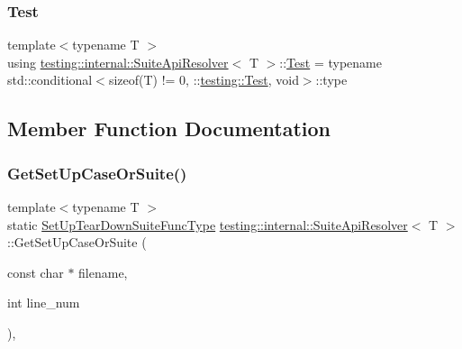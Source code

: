 \mbox{\label{structtesting_1_1internal_1_1_suite_api_resolver_a343c36f492a946d302b1cfc930266768}} 
\subsubsection{\texorpdfstring{Test}{Test}\hspace{0.1cm}{\footnotesize\ttfamily [2/2]}}
{\footnotesize\ttfamily template$<$typename T $>$ \\
using \mbox{\hyperlink{structtesting_1_1internal_1_1_suite_api_resolver}{testing\+::internal\+::\+Suite\+Api\+Resolver}}$<$ T $>$\+::\mbox{\hyperlink{structtesting_1_1internal_1_1_suite_api_resolver_a343c36f492a946d302b1cfc930266768}{Test}} =  typename std\+::conditional$<$sizeof(T) != 0, \+::\mbox{\hyperlink{classtesting_1_1_test}{testing\+::\+Test}}, void$>$\+::type}



\subsection{Member Function Documentation}
\mbox{\label{structtesting_1_1internal_1_1_suite_api_resolver_abae647b1fed9422fc596fd385de6dd5b}} 
\subsubsection{\texorpdfstring{GetSetUpCaseOrSuite()}{GetSetUpCaseOrSuite()}\hspace{0.1cm}{\footnotesize\ttfamily [1/2]}}
{\footnotesize\ttfamily template$<$typename T $>$ \\
static \mbox{\hyperlink{namespacetesting_1_1internal_a754d337f5d643225115fb28f6b1d6fb1}{Set\+Up\+Tear\+Down\+Suite\+Func\+Type}} \mbox{\hyperlink{structtesting_1_1internal_1_1_suite_api_resolver}{testing\+::internal\+::\+Suite\+Api\+Resolver}}$<$ T $>$\+::Get\+Set\+Up\+Case\+Or\+Suite (\begin{DoxyParamCaption}\item[{const char $\ast$}]{filename,  }\item[{int}]{line\+\_\+num }\end{DoxyParamCaption})\hspace{0.3cm}{\ttfamily [inline]}, {\ttfamily [static]}}

